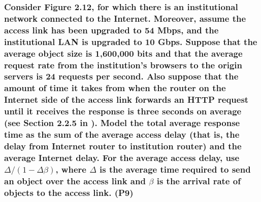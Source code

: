 \subsubsection{Consider Figure 2.12, for which there is an institutional network connected to the Internet. Moreover, assume the access link has been upgraded to 54 Mbps, and the institutional LAN is upgraded to 10 Gbps. Suppose that the average object size is 1,600,000 bits and that the average request rate from the institution's browsers to the origin servers is 24 requests per second. Also suppose that the amount of time it takes from when the router on the Internet side of the access link forwards an HTTP request until it receives the response is three seconds on average (see Section 2.2.5 in \cite{kr}). Model the total average response time as the sum of the average access delay (that is, the delay from Internet router to institution router) and the average Internet delay. For the average access delay, use $\Delta /(1 - \Delta \beta)$, where $\Delta$ is the average time required to send an object over the access link and $\beta$ is the arrival rate of objects to the access link. (P9)}


